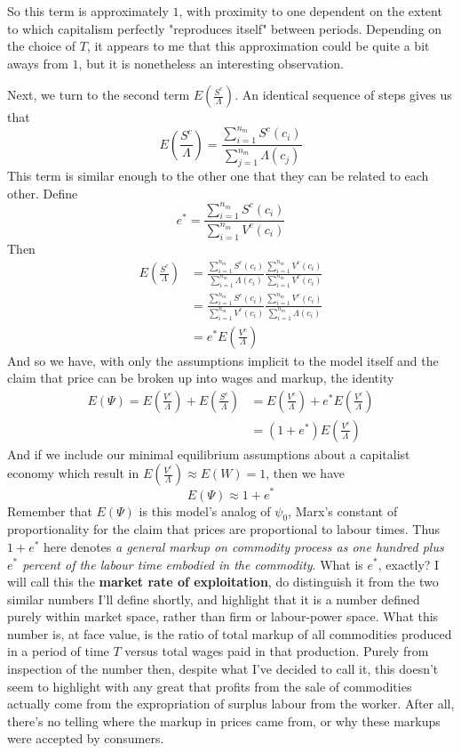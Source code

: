 \documentclass{article}
\theoremstyle{definition}
\theoremstyle{plain}
\theoremstyle{theorem}
\begin{document}
So this term is approximately $1$, with proximity to one dependent on the extent to which capitalism perfectly "reproduces itself" between periods. Depending on the choice of $T$, it appears to me that this approximation could be quite a bit aways from $1$, but it is nonetheless an interesting observation. \par 
Next, we turn to the second term $E\left(\frac{S^c}{\Lambda}\right)$. An identical sequence of steps gives us that
\[ E\left(\frac{S^c}{\Lambda}\right) = \frac{\sum_{i=1}^{n_m} S^c(c_i)}{\sum_{j=1}^{n_m} \Lambda(c_j)} \]
This term is similar enough to the other one that they can be related to each other. Define 
\[ e^* = \frac{\sum_{i=1}^{n_m} S^c(c_i)}{\sum_{i=1}^{n_m}V^c(c_i)} \]
Then 
\begin{align}
	E\left(\frac{S^c}{\Lambda} \right) &= \frac{\sum_{i=1}^{n_m} S^c(c_i)}{\sum_{i=1}^{n_m} \Lambda(c_i)}\frac{\sum_{i=1}^{n_m} V^c(c_i)}{\sum_{i=1}^{n_m} V^c(c_i)} \\
	&= \frac{\sum_{i=1}^{n_m} S^c(c_i)}{\sum_{i=1}^{n_m} V^c(c_i)}\frac{\sum_{i=1}^{n_m} V^c(c_i)}{\sum_{i=1}^{n_m} \Lambda(c_i)} \\
	&= e^*E\left( \frac{V^c}{\Lambda} \right)
\end{align} 
And so we have, with only the assumptions implicit to the model itself and the claim that price can be broken up into wages and markup, the identity
\begin{align}
	E(\Psi) =  E\left(\frac{V^c}{\Lambda}\right)+E\left(\frac{S^c}{\Lambda}\right) &= E \left( \frac{V^c}{\Lambda} \right) + e^* E \left( \frac{V^c}{\Lambda} \right) \\
	&= (1+e^*)E\left(\frac{V^c}{\Lambda}\right)
\end{align} 
And if we include our minimal equilibrium assumptions about a capitalist economy which result in $E\left(\frac{V^c}{\Lambda}\right) \approx E(W) = 1$, then we have
\[ E(\Psi) \approx 1+e^* \]
Remember that $E(\Psi)$ is this model's analog of $\psi_0$, Marx's constant of proportionality for the claim that prices are proportional to labour times. Thus $1+e^*$ here denotes \textit{a general markup on commodity process as one hundred plus $e^*$ percent of the labour time embodied in the commodity}. What is $e^*$, exactly? I will call this the \textbf{market rate of exploitation}, do distinguish it from the two similar numbers I'll define shortly, and highlight that it is a number defined purely within market space, rather than firm or labour-power space. What this number is, at face value, is the ratio of total markup of all commodities produced in a period of time $T$ versus total wages paid in that production. Purely from inspection of the number then, despite what I've decided to call it, this doesn't seem to highlight with any great that profits from the sale of commodities actually come from the expropriation of surplus labour from the worker. After all, there's no telling where the markup in prices came from, or why these markups were accepted by consumers. \par 
\end{document}
